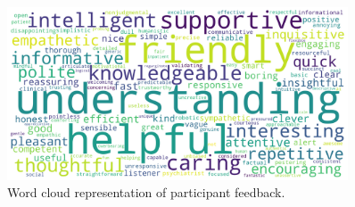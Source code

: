 \begin{figure}[!htbp]
\centering
  \includegraphics[width=0.9\textwidth]{fig/wordcloud.png}
  \caption{Word cloud representation of participant feedback.}
  \label{word_cloud}
\end{figure}
